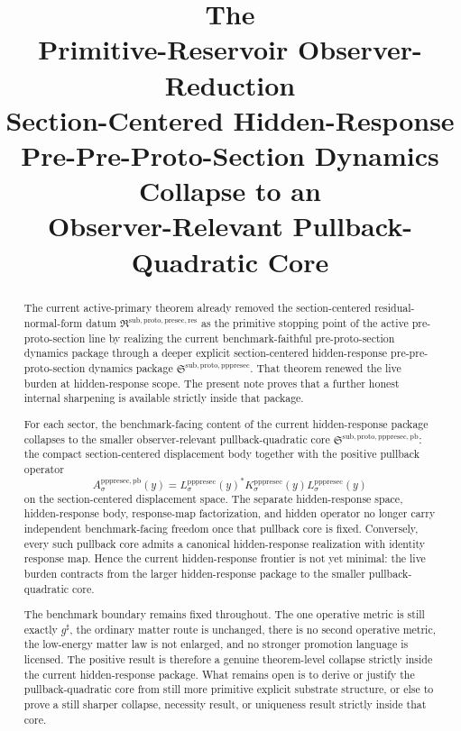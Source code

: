 \documentclass[11pt]{article}
\title{\textbf{The \TheoryName{}}\\[0.4em]
\large Primitive-Reservoir Observer-Reduction\\
\large Section-Centered Hidden-Response\\
\large Pre-Pre-Proto-Section Dynamics Collapse to an\\
\large Observer-Relevant Pullback-Quadratic Core}
\author{}
\date{}
\newcommand{\CompletedMetric}{g^{\sharp}}
\newcommand{\PreProtoSectionResidualPackage}{\mathfrak R^{\mathrm{sub,proto,presec,res}}}
\newcommand{\PrePreProtoSectionPackage}{\mathfrak S^{\mathrm{sub,proto,pppresec}}}
\newcommand{\PrePreProtoSectionResponseMap}[1]{L_{#1}^{\mathrm{pppresec}}}
\newcommand{\PrePreProtoSectionOperator}[1]{K_{#1}^{\mathrm{pppresec}}}
\newcommand{\PrePreProtoSectionPullbackCore}{\mathfrak S^{\mathrm{sub,proto,pppresec,pb}}}
\newcommand{\PrePreProtoSectionPullbackOperator}[1]{A_{#1}^{\mathrm{pppresec,pb}}}
\begin{document}
\maketitle

\begin{abstract}
The current active-primary theorem already removed the section-centered residual-normal-form datum \(\PreProtoSectionResidualPackage\) as the primitive stopping point of the active pre-proto-section line by realizing the current benchmark-faithful pre-proto-section dynamics package through a deeper explicit section-centered hidden-response pre-pre-proto-section dynamics package \(\PrePreProtoSectionPackage\). That theorem renewed the live burden at hidden-response scope. The present note proves that a further honest internal sharpening is available strictly inside that package.

For each sector, the benchmark-facing content of the current hidden-response package collapses to the smaller observer-relevant pullback-quadratic core \(\PrePreProtoSectionPullbackCore\): the compact section-centered displacement body together with the positive pullback operator
\[
\PrePreProtoSectionPullbackOperator{\sigma}(y)
=
\PrePreProtoSectionResponseMap{\sigma}(y)^{*}
\PrePreProtoSectionOperator{\sigma}(y)
\PrePreProtoSectionResponseMap{\sigma}(y)
\]
on the section-centered displacement space. The separate hidden-response space, hidden-response body, response-map factorization, and hidden operator no longer carry independent benchmark-facing freedom once that pullback core is fixed. Conversely, every such pullback core admits a canonical hidden-response realization with identity response map. Hence the current hidden-response frontier is not yet minimal: the live burden contracts from the larger hidden-response package to the smaller pullback-quadratic core.

The benchmark boundary remains fixed throughout. The one operative metric is still exactly \(\CompletedMetric\), the ordinary matter route is unchanged, there is no second operative metric, the low-energy matter law is not enlarged, and no stronger promotion language is licensed. The positive result is therefore a genuine theorem-level collapse strictly inside the current hidden-response package. What remains open is to derive or justify the pullback-quadratic core from still more primitive explicit substrate structure, or else to prove a still sharper collapse, necessity result, or uniqueness result strictly inside that core.
\end{abstract}
\end{document}
